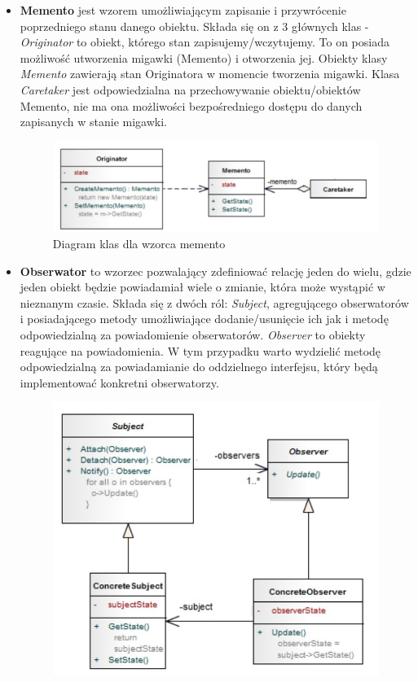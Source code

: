 \documentclass[a4paper,12pt,oneside]{book}
\begin{document}
\begin{itemize}
                    \item \textbf{Memento} jest wzorem umożliwiającym zapisanie i przywrócenie poprzedniego stanu danego obiektu. Składa się on z 3 głównych klas - \textit{Originator} to obiekt, którego stan zapisujemy/wczytujemy. To on posiada możliwość utworzenia migawki (Memento) i otworzenia jej. Obiekty klasy \textit{Memento} zawierają stan Originatora w momencie tworzenia migawki. Klasa \textit{Caretaker} jest odpowiedzialna na przechowywanie obiektu/obiektów Memento, nie ma ona możliwości bezpośredniego dostępu do danych zapisanych w stanie migawki.
                    \begin{figure}[h]
                        \centering
                        \includegraphics[width=\textwidth/2]{images/memento.jpg}
                        \caption{Diagram klas dla wzorca memento}
                        \label{fig:twojastara14}
                    \end{figure}
                    \item \textbf{Obserwator} to wzorzec pozwalający zdefiniować relację jeden do wielu, gdzie jeden obiekt będzie powiadamiał wiele o zmianie, która może wystąpić w nieznanym czasie. Składa się z dwóch ról: \textit{Subject}, agregującego obserwatorów i posiadającego metody umożliwiające dodanie/usunięcie ich jak i metodę odpowiedzialną za powiadomienie obserwatorów. \textit{Observer} to obiekty reagujące na powiadomienia. W tym przypadku warto wydzielić metodę odpowiedzialną za powiadamianie do oddzielnego interfejsu, który będą implementować konkretni obserwatorzy.
                    \begin{figure}[h]
                        \centering
                        \includegraphics[width=\textwidth/2]{images/observer.jpg}

\end{figure}
\end{itemize}
\end{document}
